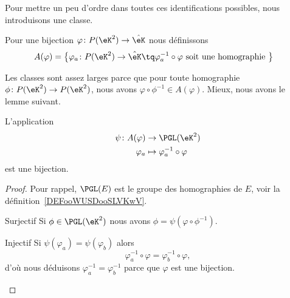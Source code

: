 Pour mettre un peu d'ordre dans toutes ces identifications possibles, nous introduisons une classe.

\begin{definition}      \label{DEFooMLQUooGwvQMh}
    Pour une bijection \( \varphi\colon P(\eK^2)\to \hat\eK\) nous définissons
\begin{equation}
    \begin{aligned}[]
    A(\varphi)=\big\{  \varphi_a\colon P(\eK^2)&\to \hat\eK \tq \varphi_a^{-1}\circ\varphi
    \text{ soit une homographie } \big\}
    \end{aligned}
\end{equation}
\end{definition}

Les classes sont assez larges parce que pour toute homographie \( \phi\colon P(\eK^2)\to P(\eK^2)\), nous avons \( \varphi\circ\phi^{-1}\in A(\varphi)\). Mieux, nous avons le lemme suivant.

\begin{lemma}
    L'application
    \begin{equation}
        \begin{aligned}
            \psi\colon A(\varphi)&\to \PGL(\eK^2) \\
            \varphi_a&\mapsto \varphi_a^{-1}\circ\varphi
        \end{aligned}
    \end{equation}
    est une bijection.
\end{lemma}

\begin{proof}
    Pour rappel, \( \PGL(E)\) est le groupe des homographies de \( E\), voir la définition~\ref{DEFooWUSDooSLVKwV}.
    \begin{subproof}
    \item[Surjectif]
        Si \( \phi\in\PGL(\eK^2)\) nous avons \( \phi=\psi(\varphi\circ\phi^{-1})\).
    \item[Injectif]
        Si \( \psi(\varphi_a)=\psi(\varphi_b)\) alors
        \begin{equation}
            \varphi_a^{-1}\circ\varphi=\varphi_b^{-1}\circ\varphi,
        \end{equation}
        d'où nous déduisons \( \varphi_a^{-1}=\varphi_b^{-1}\) parce que \( \varphi\) est une bijection.
    \end{subproof}
\end{proof}

